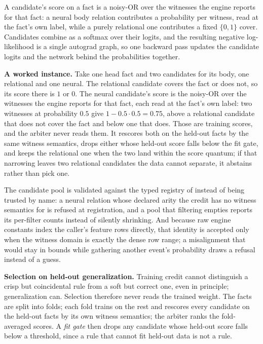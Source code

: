 A candidate's score on a fact is a noisy-OR over the witnesses the engine reports for that fact: a neural body relation contributes a probability per witness, read at the fact's own label, while a purely relational one contributes a fixed $\{0,1\}$ cover. Candidates combine as a softmax over their logits, and the resulting negative log-likelihood is a single autograd graph, so one backward pass updates the candidate logits and the network behind the probabilities together.

\textbf{A worked instance.} Take one head fact and two candidates for its body, one relational and one neural. The relational candidate covers the fact or does not, so its score there is $1$ or $0$. The neural candidate's score is the noisy-OR over the witnesses the engine reports for that fact, each read at the fact's own label: two witnesses at probability $0.5$ give $1-0.5\cdot0.5=0.75$, above a relational candidate that does not cover the fact and below one that does. Those are training scores, and the arbiter never reads them. It rescores both on the held-out facts by the same witness semantics, drops either whose held-out score falls below the fit gate, and keeps the relational one when the two land within the score quantum; if that narrowing leaves two relational candidates the data cannot separate, it abstains rather than pick one.

The candidate pool is validated against the typed registry of  instead of being trusted by name: a neural relation whose declared arity the credit has no witness semantics for is refused at registration, and a pool that filtering empties reports its per-filter counts instead of silently shrinking. And because raw engine constants index the caller's feature rows directly, that identity is accepted only when the witness domain is exactly the dense row range; a misalignment that would stay in bounds while gathering another event's probability draws a refusal instead of a guess.

\textbf{Selection on held-out generalization.} Training credit cannot distinguish a crisp but coincidental rule from a soft but correct one, even in principle; generalization can. Selection therefore never reads the trained weight. The facts are split into folds; each fold trains on the rest and rescores every candidate on the held-out facts by its own witness semantics; the arbiter ranks the fold-averaged scores. A \emph{fit gate} then drops any candidate whose held-out score falls below a threshold, since a rule that cannot fit held-out data is not a rule.

